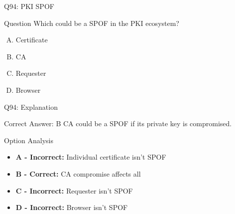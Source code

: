 \documentclass{beamer}
\begin{document}
	\begin{frame}{Q94: PKI SPOF}
		\begin{block}{Question}
			Which could be a SPOF in the PKI ecosystem?
		\end{block}
		\begin{enumerate}[(A)]
			\item Certificate
			\item CA
			\item Requester
			\item Browser
		\end{enumerate}
	\end{frame}
	
	\begin{frame}{Q94: Explanation}
		\begin{block}{Correct Answer: B}
			CA could be a SPOF if its private key is compromised.
		\end{block}
		\begin{block}{Option Analysis}
			\begin{itemize}
				\item \textbf{A - Incorrect:} Individual certificate isn't SPOF
				\item \textbf{B - Correct:} CA compromise affects all
				\item \textbf{C - Incorrect:} Requester isn't SPOF
				\item \textbf{D - Incorrect:} Browser isn't SPOF
			\end{itemize}
		\end{block}
	\end{frame}
	
\end{document}
